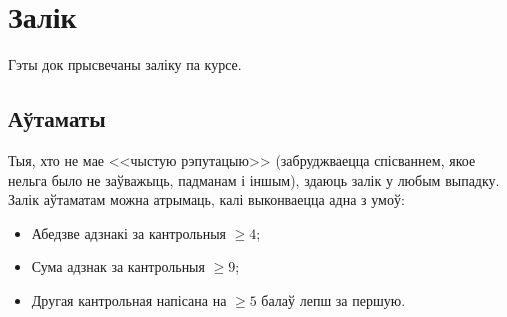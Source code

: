\documentclass[12pt, a4paper]{extarticle}
\renewcommand{\ge}{\geqslant}
\begin{document}
    \section{Залік}
    Гэты док прысвечаны заліку па курсе.
    
    \subsection{Аўтаматы}
    Тыя, хто не мае <<чыстую рэпутацыю>> (забруджваецца спісваннем, якое нельга было не заўважыць, падманам і іншым), здаюць залік у любым выпадку.
    Залік аўтаматам можна атрымаць, калі выконваецца адна з умоў:
    \begin{itemize}
        \item Абедзве адзнакі за кантрольныя $\ge 4$;
        \item Сума адзнак за кантрольныя $\ge 9$;
        \item Другая кантрольная напісана на $\ge 5$ балаў лепш за першую.
    \end{itemize}
\end{document}
